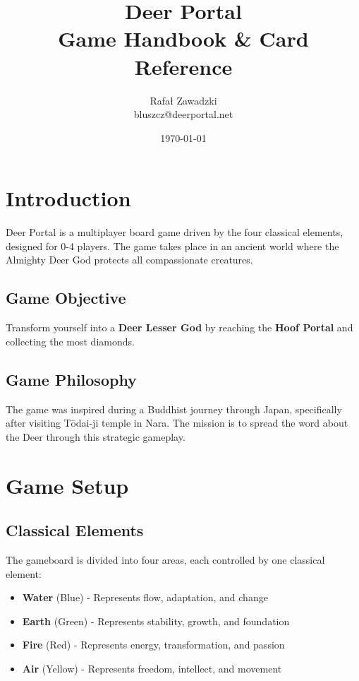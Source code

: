 \documentclass[12pt,a4paper]{article}
\title{Deer Portal \\ \large Game Handbook \& Card Reference}
\date{\today}
\author{Rafał Zawadzki \\ \small bluszcz@deerportal.net}
\begin{document}
\maketitle
\newpage

\tableofcontents
\newpage

\section{Introduction}

Deer Portal is a multiplayer board game driven by the four classical elements, designed for 0-4 players. The game takes place in an ancient world where the Almighty Deer God protects all compassionate creatures.

\subsection{Game Objective}
Transform yourself into a \textbf{Deer Lesser God} by reaching the \textbf{Hoof Portal} and collecting the most diamonds.

\subsection{Game Philosophy}
The game was inspired during a Buddhist journey through Japan, specifically after visiting Tōdai-ji temple in Nara. The mission is to spread the word about the Deer through this strategic gameplay.

\section{Game Setup}

\subsection{Classical Elements}
The gameboard is divided into four areas, each controlled by one classical element:

\begin{itemize}
    \item \textcolor{waterblue}{\textbf{Water}} (Blue) - Represents flow, adaptation, and change
    \item \textcolor{earthgreen}{\textbf{Earth}} (Green) - Represents stability, growth, and foundation  
    \item \textcolor{firered}{\textbf{Fire}} (Red) - Represents energy, transformation, and passion
    \item \textcolor{airyellow}{\textbf{Air}} (Yellow) - Represents freedom, intellect, and movement
\end{itemize}
\end{document}
